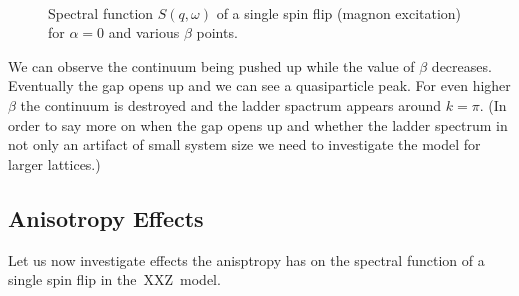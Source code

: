 \documentclass[12pt, a4paper]{article}
\begin{document}
\begin{figure}
{	}
	\\
	\caption{Spectral function $S(q,\omega)$ of a single spin flip (magnon excitation) for $\alpha = 0$ and various $\beta$ points.}\label{fig:XY_beta_dep}
\end{figure}
We can observe the continuum being pushed up while the value of $\beta$ decreases. Eventually the gap opens up and we can see a quasiparticle peak. For even higher $\beta$ the continuum is destroyed and the ladder spactrum appears around $k = \pi$. (In order to say more on when the gap opens up and whether the ladder spectrum in not only an artifact of small system size we need to investigate the model for larger lattices.)

\subsection{Anisotropy Effects}
Let us now investigate effects the anisptropy has on the spectral function of a single spin flip in the~XXZ~model. 
\end{document}
